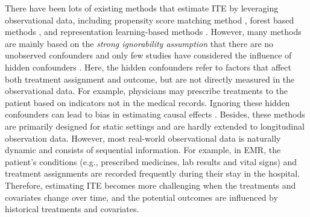 There have been lots of existing methods that estimate ITE by leveraging observational data, including propensity score matching method \cite{rosenbaum1983central}, forest based methods \cite{hill2011bayesian,wager2018estimation}, and representation learning-based methods \cite{johansson2016learning,shalit2017estimating,yao2018representation}. However, many methods are mainly based on the \textit{strong ignorability assumption} that there are no unobserved confounders and only few studies have considered the influence of hidden confounders \cite{louizos2017causal}. Here, the hidden confounders refer to factors that affect both treatment assignment and outcome, but are not directly measured in the observational data. For example, physicians may prescribe treatments to the patient based on indicators not in the medical records. Ignoring these hidden confounders can lead to bias in estimating causal effects \cite{pearl2009causality}. 
Besides, these methods are primarily designed for static settings and are hardly extended to longitudinal observation data. However, most real-world observational data is naturally dynamic and consists of sequential information. For example, in EMR, the patient's conditions (e.g., prescribed medicines, lab results and vital signs) and treatment assignments are recorded frequently during their stay in the hospital. Therefore, estimating ITE becomes more challenging when the treatments and covariates change over time, and the potential outcomes are influenced by historical treatments and covariates. 



